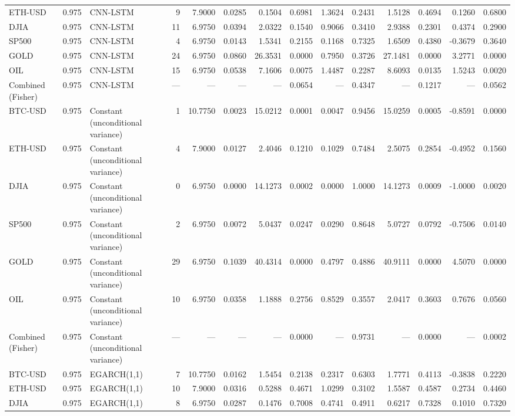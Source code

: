 \begin{table}[ht]
\begin{tabular}{lllrrrrrrrrrrr}
ETH-USD & 0.975 & CNN-LSTM & 9 & 7.9000 & 0.0285 & 0.1504 & 0.6981 & 1.3624 & 0.2431 & 1.5128 & 0.4694 & 0.1260 & 0.6800 \\
DJIA & 0.975 & CNN-LSTM & 11 & 6.9750 & 0.0394 & 2.0322 & 0.1540 & 0.9066 & 0.3410 & 2.9388 & 0.2301 & 0.4374 & 0.2900 \\
SP500 & 0.975 & CNN-LSTM & 4 & 6.9750 & 0.0143 & 1.5341 & 0.2155 & 0.1168 & 0.7325 & 1.6509 & 0.4380 & -0.3679 & 0.3640 \\
GOLD & 0.975 & CNN-LSTM & 24 & 6.9750 & 0.0860 & 26.3531 & 0.0000 & 0.7950 & 0.3726 & 27.1481 & 0.0000 & 3.2771 & 0.0000 \\
OIL & 0.975 & CNN-LSTM & 15 & 6.9750 & 0.0538 & 7.1606 & 0.0075 & 1.4487 & 0.2287 & 8.6093 & 0.0135 & 1.5243 & 0.0020 \\
Combined (Fisher) & 0.975 & CNN-LSTM & — & — & — & — & 0.0654 & — & 0.4347 & — & 0.1217 & — & 0.0562 \\
BTC-USD & 0.975 & Constant (unconditional variance) & 1 & 10.7750 & 0.0023 & 15.0212 & 0.0001 & 0.0047 & 0.9456 & 15.0259 & 0.0005 & -0.8591 & 0.0000 \\
ETH-USD & 0.975 & Constant (unconditional variance) & 4 & 7.9000 & 0.0127 & 2.4046 & 0.1210 & 0.1029 & 0.7484 & 2.5075 & 0.2854 & -0.4952 & 0.1560 \\
DJIA & 0.975 & Constant (unconditional variance) & 0 & 6.9750 & 0.0000 & 14.1273 & 0.0002 & 0.0000 & 1.0000 & 14.1273 & 0.0009 & -1.0000 & 0.0020 \\
SP500 & 0.975 & Constant (unconditional variance) & 2 & 6.9750 & 0.0072 & 5.0437 & 0.0247 & 0.0290 & 0.8648 & 5.0727 & 0.0792 & -0.7506 & 0.0140 \\
GOLD & 0.975 & Constant (unconditional variance) & 29 & 6.9750 & 0.1039 & 40.4314 & 0.0000 & 0.4797 & 0.4886 & 40.9111 & 0.0000 & 4.5070 & 0.0000 \\
OIL & 0.975 & Constant (unconditional variance) & 10 & 6.9750 & 0.0358 & 1.1888 & 0.2756 & 0.8529 & 0.3557 & 2.0417 & 0.3603 & 0.7676 & 0.0560 \\
Combined (Fisher) & 0.975 & Constant (unconditional variance) & — & — & — & — & 0.0000 & — & 0.9731 & — & 0.0000 & — & 0.0002 \\
BTC-USD & 0.975 & EGARCH(1,1) & 7 & 10.7750 & 0.0162 & 1.5454 & 0.2138 & 0.2317 & 0.6303 & 1.7771 & 0.4113 & -0.3838 & 0.2220 \\
ETH-USD & 0.975 & EGARCH(1,1) & 10 & 7.9000 & 0.0316 & 0.5288 & 0.4671 & 1.0299 & 0.3102 & 1.5587 & 0.4587 & 0.2734 & 0.4460 \\
DJIA & 0.975 & EGARCH(1,1) & 8 & 6.9750 & 0.0287 & 0.1476 & 0.7008 & 0.4741 & 0.4911 & 0.6217 & 0.7328 & 0.1010 & 0.7320 \\

\end{tabular}
\end{table}

